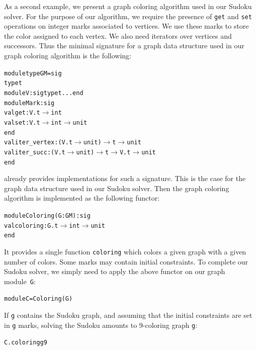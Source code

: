 As a second example, we present a graph coloring algorithm used in our
Sudoku solver.
For the purpose of our
algorithm, we require the presence of \texttt{get} and \texttt{set}
operations on integer marks associated to vertices. We use these marks
to store the color assigned to each vertex. We also need iterators
over vertices and successors. Thus the minimal signature for a graph
data structure used in our graph coloring algorithm is the following:
\begin{alltt}
module type GM = sig
  type t
  module V : sig type t ... end
  module Mark : sig
    val get : V.t \ensuremath{\rightarrow} int
    val set : V.t \ensuremath{\rightarrow} int \ensuremath{\rightarrow} unit
  end
  val iter_vertex : (V.t \ensuremath{\rightarrow} unit) \ensuremath{\rightarrow} t \ensuremath{\rightarrow} unit
  val iter_succ : (V.t \ensuremath{\rightarrow} unit) \ensuremath{\rightarrow} t \ensuremath{\rightarrow} V.t \ensuremath{\rightarrow} unit
end
\end{alltt}
\ocamlgraph already provides implementations for such a
signature. This is the case for the graph data structure used in our
Sudoku solver.
Then the graph coloring algorithm is implemented as the following functor:
\begin{alltt}
module Coloring(G : GM) : sig
  val coloring : G.t \ensuremath{\rightarrow} int \ensuremath{\rightarrow} unit
end
\end{alltt}
It provides a single function \texttt{coloring} which colors a given
graph with a given number of colors. Some marks may contain initial
constraints. 
%
To complete our Sudoku solver, we simply need to apply the above
functor on our graph module~\texttt{G}:
\begin{alltt}
module C = Coloring(G)
\end{alltt}
If \texttt{g} contains the Sudoku graph, and
assuming that the initial constraints are set in \texttt{g} marks, 
solving the Sudoku amounts to 9-coloring graph \texttt{g}:
\begin{alltt}
C.coloring g 9
\end{alltt}


